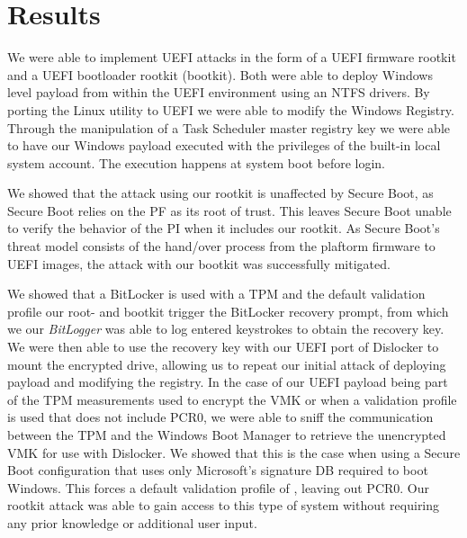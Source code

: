 
\chapter{Results}

We were able to implement \ac{UEFI} attacks in the form of a \ac{UEFI} firmware rootkit and a \ac{UEFI} bootloader rootkit (bootkit).
Both were able to deploy Windows level payload from within the \ac{UEFI} environment using an \ac{NTFS} drivers.
By porting the Linux utility  to \ac{UEFI} we were able to modify the Windows Registry.
Through the manipulation of a Task Scheduler master registry key we were able to have our Windows payload executed with the privileges of the built-in local system account.
The execution happens at system boot before login.

We showed that the attack using our rootkit is unaffected by Secure Boot, as Secure Boot relies on the \ac{PF} as its root of trust.
This leaves Secure Boot unable to verify the behavior of the \ac{PI} when it includes our rootkit.
As Secure Boot's threat model consists of the hand\-/over process from the plaftorm firmware to \ac{UEFI} images, the attack with our bootkit was successfully mitigated.

We showed that a BitLocker is used with a \ac{TPM} and the default validation profile  our root- and bootkit trigger the BitLocker recovery prompt, from which we our \emph{BitLogger} was able to log entered keystrokes to obtain the recovery key.
We were then able to use the recovery key with our \ac{UEFI} port of Dislocker to mount the encrypted drive, allowing us to repeat our initial attack of deploying payload and modifying the registry.
In the case of our \ac{UEFI} payload being part of the \ac{TPM} measurements used to encrypt the \ac{VMK} or when a validation profile is used that does not include \ac{PCR}0, we were able to sniff the communication between the \ac{TPM} and the Windows Boot Manager to retrieve the unencrypted \ac{VMK} for use with Dislocker.
We showed that this is the case when using a Secure Boot configuration that uses only Microsoft's signature \ac{DB} required to boot Windows.
This forces a default validation profile of , leaving out \ac{PCR}0.
Our rootkit attack was able to gain access to this type of system without requiring any prior knowledge or additional user input.